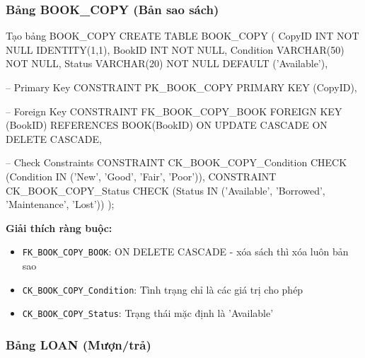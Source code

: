 \documentclass[12pt,a4paper]{article}
\begin{document}
\subsubsection{Bảng BOOK\_COPY (Bản sao sách)}

\begin{sqlcode}{Tạo bảng BOOK\_COPY}
CREATE TABLE BOOK_COPY (
    CopyID         INT             NOT NULL   IDENTITY(1,1),
    BookID         INT             NOT NULL,
    Condition      VARCHAR(50)     NOT NULL,
    Status         VARCHAR(20)     NOT NULL   DEFAULT ('Available'),

    -- Primary Key
    CONSTRAINT PK_BOOK_COPY PRIMARY KEY (CopyID),

    -- Foreign Key
    CONSTRAINT FK_BOOK_COPY_BOOK FOREIGN KEY (BookID)
        REFERENCES BOOK(BookID)
        ON UPDATE CASCADE
        ON DELETE CASCADE,

    -- Check Constraints
    CONSTRAINT CK_BOOK_COPY_Condition
        CHECK (Condition IN ('New', 'Good', 'Fair', 'Poor')),
    CONSTRAINT CK_BOOK_COPY_Status
        CHECK (Status IN ('Available', 'Borrowed', 'Maintenance', 'Lost'))
);
\end{sqlcode}

\textbf{Giải thích ràng buộc:}
\begin{itemize}
    \item \texttt{FK\_BOOK\_COPY\_BOOK}: ON DELETE CASCADE - xóa sách thì xóa luôn bản sao
    \item \texttt{CK\_BOOK\_COPY\_Condition}: Tình trạng chỉ là các giá trị cho phép
    \item \texttt{CK\_BOOK\_COPY\_Status}: Trạng thái mặc định là 'Available'
\end{itemize}

\subsubsection{Bảng LOAN (Mượn/trả)}
\end{document}
